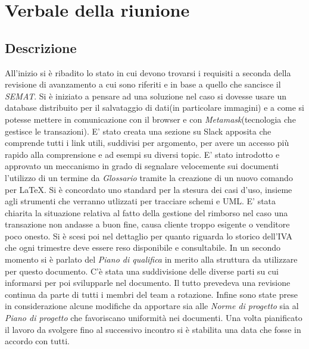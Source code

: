 \section{Verbale della riunione}

\subsection{Descrizione}
All'inizio si è ribadito lo stato in cui devono trovarsi i requisiti a seconda della revisione di avanzamento a cui sono riferiti e in base a quello che sancisce il \textit{SEMAT}.\newline
Si è iniziato a pensare ad una soluzione nel caso si dovesse usare un database distribuito per il salvataggio di dati(in particolare immagini) e a come si potesse mettere in comunicazione con il browser e con \textit{Metamask}(tecnologia che gestisce le transazioni).\newline
E' stato creata una sezione su Slack apposita che comprende tutti i  link utili, suddivisi per argomento, per avere un accesso più rapido alla comprensione e ad esempi su diversi topic. \newline
E' stato introdotto e approvato un meccanismo in grado di segnalare velocemente sui documenti l'utilizzo di un termine da \textit{Glossario} tramite la creazione di un nuovo comando per \LaTeX. \newline
Si è concordato uno standard per la stesura dei casi d'uso, insieme agli strumenti che verranno utlizzati per tracciare schemi e UML. \newline
E' stata chiarita la situazione relativa al fatto della gestione del rimborso nel caso una transazione non andasse a buon fine, causa cliente troppo esigente o venditore poco onesto. Si è scesi poi nel dettaglio per quanto riguarda lo storico dell'IVA che ogni trimestre deve essere reso disponibile e consultabile. \newline
In un secondo momento si è parlato del \textit{Piano di qualifica} in merito alla struttura da utilizzare per questo documento. C'è stata una suddivisione delle diverse parti su cui informarsi per poi svilupparle nel documento. Il tutto prevedeva una revisione continua da parte di tutti i membri del team a rotazione. \newline
Infine sono state prese in considerazione alcune modifiche da apportare sia alle \textit{Norme di progetto} sia al \textit{Piano di progetto} che favoriscano uniformità nei documenti. Una volta pianificato il lavoro da svolgere fino al successivo incontro si è stabilita una data che fosse in accordo con tutti.
\pagebreak
